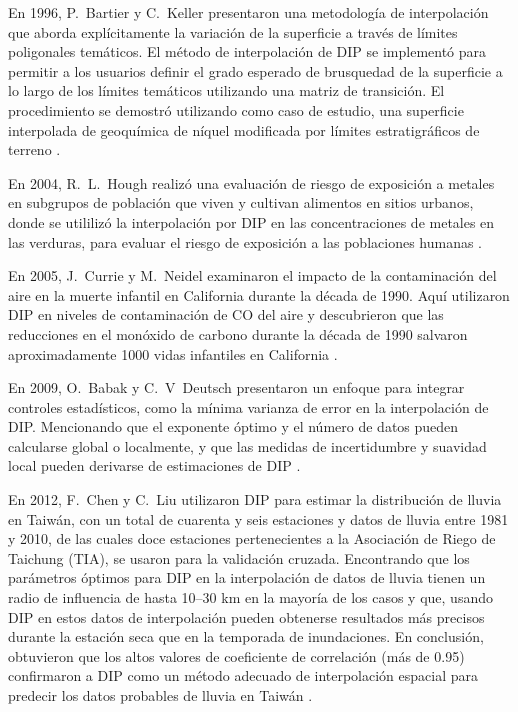 En 1996, P.\ Bartier y C.\ Keller presentaron una metodología de interpolación que aborda explícitamente la variación de la superficie a través de límites poligonales temáticos. El método de interpolación de DIP se implementó para permitir a los usuarios definir el grado esperado de brusquedad de la superficie a lo largo de los límites temáticos utilizando una matriz de transición. El procedimiento se demostró utilizando como caso de estudio, una superficie interpolada de geoquímica de níquel modificada por límites estratigráficos de terreno \citep{bartier}.

En 2004, R.\ L.\ Hough realizó una evaluación de riesgo de exposición a metales en subgrupos de población que viven y cultivan alimentos en sitios urbanos, donde se utililizó la interpolación por DIP en las concentraciones de metales en las verduras, para evaluar el riesgo de exposición a las poblaciones humanas \citep{hough}.

En 2005, J.\ Currie y M.\ Neidel examinaron el impacto de la contaminación del aire en la muerte infantil en California durante la década de 1990. Aquí utilizaron DIP en niveles de contaminación de CO del aire y descubrieron que las reducciones en el monóxido de carbono durante la década de 1990 salvaron aproximadamente 1000 vidas infantiles en California \citep{currie}.

En 2009, O.\ Babak y C.\ V\ Deutsch presentaron un enfoque para integrar controles estadísticos, como la mínima varianza de error en la interpolación de DIP. Mencionando que el exponente óptimo y el número de datos pueden calcularse global o localmente, y que las medidas de incertidumbre y suavidad local pueden derivarse de estimaciones de DIP \citep{babak}.

En 2012, F.\ Chen y C.\ Liu utilizaron DIP para estimar la distribución de lluvia en Taiwán, con un total de cuarenta y seis estaciones y datos de lluvia entre 1981 y 2010, de las cuales doce estaciones pertenecientes a la Asociación de Riego de Taichung (TIA), se usaron para la validación cruzada. Encontrando que los parámetros óptimos para DIP en la interpolación de datos de lluvia tienen un radio de influencia de hasta 10--30 km en la mayoría de los casos y que, usando DIP en estos datos de interpolación pueden obtenerse resultados más precisos durante la estación seca que en la temporada de inundaciones. En conclusión, obtuvieron que los altos valores de coeficiente de correlación (más de 0.95) confirmaron a DIP como un método adecuado de interpolación espacial para predecir los datos probables de lluvia en Taiwán \citep{chen}.



